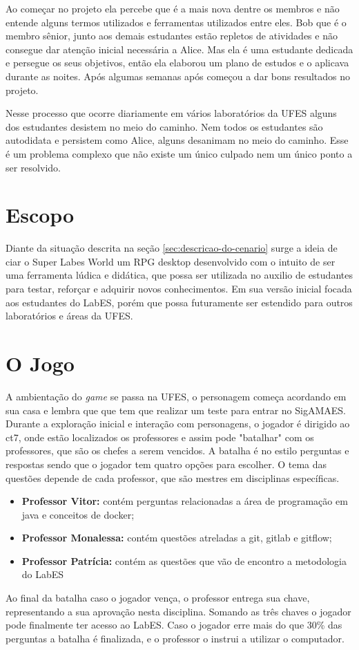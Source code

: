 Ao começar no projeto ela percebe que é a mais nova dentre os membros e não entende alguns termos utilizados e ferramentas utilizados entre eles. Bob que é o membro sênior,  junto aos demais estudantes estão repletos de atividades e não consegue dar atenção inicial necessária a Alice. Mas ela é uma estudante dedicada e persegue os seus objetivos, então ela elaborou um plano de estudos e o aplicava durante as noites. Após algumas semanas após começou a dar bons resultados no projeto.

Nesse processo que ocorre diariamente em vários laboratórios da UFES alguns dos estudantes desistem no meio do caminho. Nem todos os estudantes são autodidata e persistem como Alice, alguns desanimam no meio do caminho. Esse é um problema complexo que não existe um único culpado nem um único ponto a ser resolvido. 

\section{Escopo}
\label{sec:escopo}
Diante da situação descrita na seção \ref{sec:descricao-do-cenario} surge a ideia de ciar o Super Labes World um RPG desktop desenvolvido com o intuito de ser uma ferramenta lúdica e didática, que possa ser utilizada no auxilio de estudantes para testar, reforçar e adquirir novos conhecimentos. Em sua versão inicial focada aos estudantes do LabES, porém que possa futuramente ser estendido para outros laboratórios e áreas da UFES.

\section{O Jogo}
\label{sec:jogo}
A ambientação do \textit{game} se passa na UFES, o personagem começa acordando em sua casa e lembra que que tem que realizar um teste para entrar no SigAMAES. Durante a exploração inicial e interação com personagens, o jogador é dirigido ao ct7, onde estão localizados os professores e assim pode "batalhar" com os professores, que são os chefes a serem vencidos. A batalha é no estilo perguntas e respostas sendo que o jogador tem quatro opções para escolher. O tema das questões depende de cada professor, que são mestres em disciplinas específicas.
\begin{itemize}
    \item \textbf{Professor Vitor: }contém perguntas relacionadas a área de programação em java e conceitos de docker;
    \item \textbf{Professor Monalessa: }contém questões atreladas a git, gitlab e gitflow;
    \item \textbf{Professor Patrícia: } contém as questões que vão de encontro a metodologia do LabES
\end{itemize}
Ao final da batalha caso o jogador vença, o professor entrega sua chave, representando a sua aprovação nesta disciplina. Somando as três chaves o jogador pode finalmente ter acesso ao LabES.
Caso o jogador erre mais do que 30\% das perguntas a batalha é finalizada, e o professor o instrui a utilizar o computador. 

